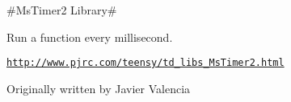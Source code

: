 \#\+Ms\+Timer2 Library\#

Run a function every millisecond.

\href{http://www.pjrc.com/teensy/td_libs_MsTimer2.html}{\tt http\+://www.\+pjrc.\+com/teensy/td\+\_\+libs\+\_\+\+Ms\+Timer2.\+html}

Originally written by Javier Valencia 